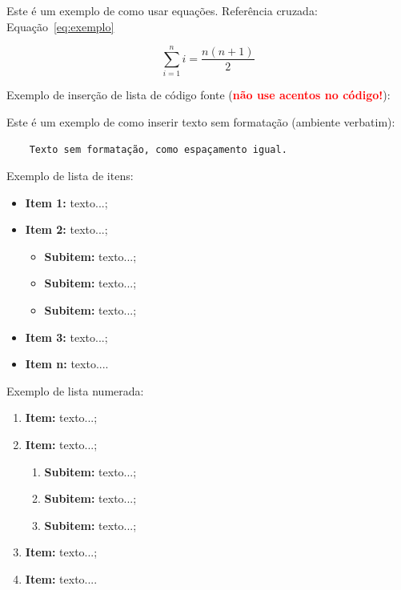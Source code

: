 Este é um exemplo de como usar equações. Referência cruzada: Equação~\ref{eq:exemplo}

\begin{equation}
\sum_{i=1}^{n} i = \frac{n(n+1)}{2}
\label{eq:exemplo}
\end{equation}

\clearpage

Exemplo de inserção de lista de código fonte (\textbf{\textcolor{red}{não use acentos no código!}}):

% 



Este é um exemplo de como inserir texto sem formatação (ambiente verbatim):

\begin{verbatim}
	Texto sem formatação, como espaçamento igual.
\end{verbatim}


Exemplo de lista de itens:

\begin{itemize}
	\item \textbf{Item 1:} texto...;
	\item \textbf{Item 2:} texto...;
    \begin{itemize}
            \item \textbf{Subitem:} texto...;
            \item \textbf{Subitem:} texto...;
            \item \textbf{Subitem:} texto...;
        \end{itemize}
	\item \textbf{Item 3:} texto...;
	\item \textbf{Item n:} texto....
\end{itemize}


Exemplo de lista numerada:

\begin{enumerate}
	\item \textbf{Item:} texto...;
	\item \textbf{Item:} texto...;
    \begin{enumerate}
        \item \textbf{Subitem:} texto...;
        \item \textbf{Subitem:} texto...;
        \item \textbf{Subitem:} texto...;
    \end{enumerate}
	\item \textbf{Item:} texto...;
	\item \textbf{Item:} texto....
\end{enumerate}

